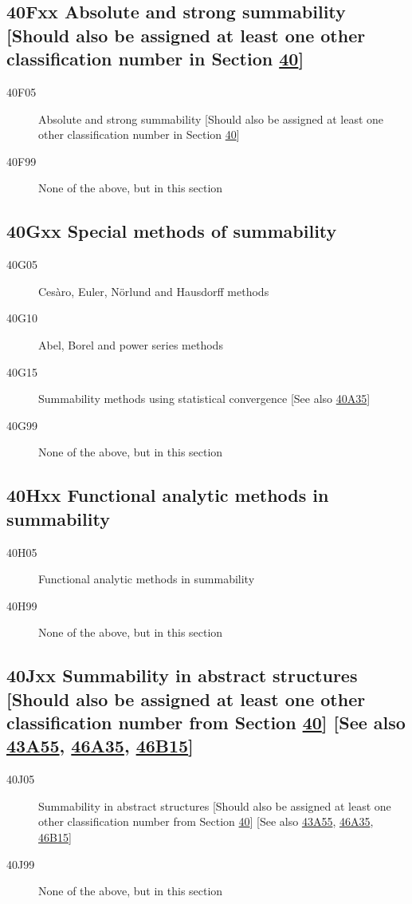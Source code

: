 \subsection*{40Fxx  Absolute and strong summability [Should also be assigned at least one other classification number in Section \hyperref[40-XX]{40}] }\label{40Fxx}
\begin{description}  
\item [40F05]\label{40F05} Absolute and strong summability [Should also be assigned at least one other classification number in Section \hyperref[40-XX]{40}]
\item [40F99]\label{40F99} None of the above, but in this section
\end{description}
\subsection*{40Gxx  Special methods of summability }\label{40Gxx}
\begin{description}  
\item [40G05]\label{40G05} Ces\`{a}ro, Euler, N\"{o}rlund and Hausdorff methods
\item [40G10]\label{40G10} Abel, Borel and power series methods
\item [40G15]\label{40G15} Summability methods using statistical convergence [See also \hyperref[40A35]{40A35}]
\item [40G99]\label{40G99} None of the above, but in this section
\end{description}
\subsection*{40Hxx  Functional analytic methods in summability}\label{40Hxx}
\begin{description}  
\item [40H05]\label{40H05} Functional analytic methods in summability
\item [40H99]\label{40H99} None of the above, but in this section
\end{description}
\subsection*{40Jxx  Summability in abstract structures [Should also be assigned at least one other classification number from Section \hyperref[40-XX]{40}] [See also \hyperref[43A55]{43A55}, \hyperref[46A35]{46A35}, \hyperref[46B15]{46B15}] }\label{40Jxx}
\begin{description}  
\item [40J05]\label{40J05} Summability in abstract structures [Should also be assigned at least one other classification number from Section \hyperref[40-XX]{40}] [See also \hyperref[43A55]{43A55}, \hyperref[46A35]{46A35}, \hyperref[46B15]{46B15}]
\item [40J99]\label{40J99} None of the above, but in this section
\end{description}

